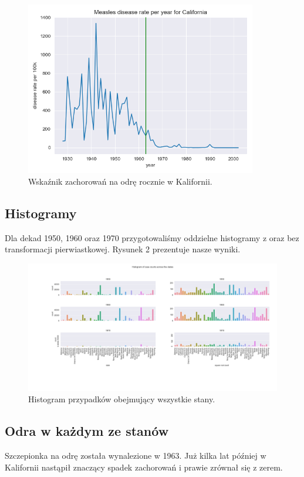 \documentclass{classrep}
\begin{document}
    \begin{figure}[H]
        \centering
        \includegraphics[width=0.9\textwidth]{images/images1/Figure_1.png}
        \caption{Wskaźnik zachorowań na odrę rocznie w Kalifornii.}
        \label{fig1}
    \end{figure}

\subsection{Histogramy}
    Dla dekad 1950, 1960 oraz 1970 przygotowaliśmy oddzielne histogramy z oraz bez transformacji pierwiastkowej.
    Rysunek 2 prezentuje nasze wyniki.

    \begin{figure}
        \centering
        \includegraphics[width=1\textwidth]{images/images1/Figure_2.png}
        \caption{Histogram przypadków obejmujący wszystkie stany.}
        \label{fig2}
    \end{figure}

\subsection{Odra w każdym ze stanów}
    Szczepionka na odrę została wynalezione w 1963. Już kilka lat później w Kalifornii nastąpił znaczący spadek zachorowań i prawie zrównał się z zerem.
\end{document}
